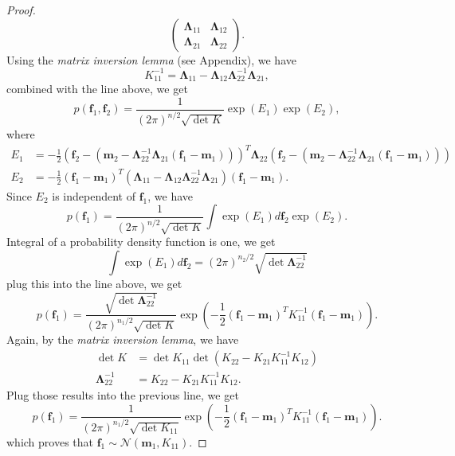 \documentclass[11pt,a4paper]{article}
\theoremstyle{definition}
\numberwithin{equation}{section}
\let\vec\mathbf
\begin{document}
\begin{proof}
\begin{equation*}
	\begin{pmatrix}
	\vec\Lambda_{11} & \vec\Lambda_{12}\\
	\vec\Lambda_{21} & \vec\Lambda_{22}
	\end{pmatrix}.
	\end{equation*}
	Using the \textit{matrix inversion lemma} (see Appendix), we have
	\begin{equation*} \label{}
	K_{11}^{-1} = \vec\Lambda_{11}-\vec\Lambda_{12}\vec\Lambda_{22}^{-1}\vec\Lambda_{21},
	\end{equation*}
	combined with the line above, we get
	\begin{equation*} \label{}
	p(\vec f_1,\vec f_2) = \frac{1}{(2\pi)^{n/2}\sqrt{\det K}}\exp{(E_1)}\exp{(E_2)},
	\end{equation*}
	where
	\begin{equation*} \label{}
	\begin{split}
	E_1 &=-\frac{1}{2}\left(\vec f_2-(\vec m_2 - \vec\Lambda_{22}^{-1} \vec\Lambda_{21}(\vec f_1 - \vec m_1))\right)^T\vec\Lambda_{22}\left(\vec f_2-(\vec m_2 - \vec\Lambda_{22}^{-1} \vec\Lambda_{21}(\vec f_1 - \vec m_1))\right)\\
	E_2 & = -\frac{1}{2}\left(\vec f_1 - \vec m_1\right)^T\left(\vec\Lambda_{11}-\vec\Lambda_{12}\vec\Lambda_{22}^{-1}\vec\Lambda_{21}\right)\left(\vec f_1 - \vec m _1 \right).
	\end{split}
	\end{equation*}
	Since $E_2$ is independent of $\vec f_1$, we have
	\begin{equation*} \label{}
	p(\vec f_1) = \frac{1}{(2\pi)^{n/2}\sqrt{\det K}}\int \exp{(E_1)}d\vec f_2\exp{(E_2)}.
	\end{equation*}
	Integral of a probability density function is one, we get
	\begin{equation*} \label{}
	\int \exp{(E_1)}d\vec f_2 = (2\pi)^{n_2/2}\sqrt{\det \vec \Lambda_{22}^{-1}}
	\end{equation*}
	plug this into the line above, we get
	\begin{equation*} \label{}
	p(\vec f_1) = \frac{\sqrt{\det \vec \Lambda_{22}^{-1}}}{(2\pi)^{n_1/2}\sqrt{\det K}} \exp{\left(-\frac{1}{2}\left(\vec f_1 - \vec m_1\right)^TK_{11}^{-1}\left(\vec f_1 - \vec m _1 \right)\right)}.
	\end{equation*}
	Again, by the \textit{matrix inversion lemma}, we have
	\begin{equation*} \label{}
	\begin{split}
	\det K&= \det K_{11}\det(K_{22}-K_{21}K_{11}^{-1}K_{12})\\
	\vec \Lambda_{22}^{-1} &= K_{22}-K_{21}K_{11}^{-1}K_{12}.
	\end{split}
	\end{equation*}
	Plug those results into the previous line, we get
	\begin{equation*} \label{}
	p(\vec f_1) = \frac{1}{(2\pi)^{n_1/2}\sqrt{\det K_{11}}} \exp{\left(-\frac{1}{2}\left(\vec f_1 - \vec m_1\right)^TK_{11}^{-1}\left(\vec f_1 - \vec m _1 \right)\right)}.
	\end{equation*}
	which proves that $\vec f_1\sim\mathcal{N}(\vec m_1,K_{11})$.
\end{proof}
\end{document}
